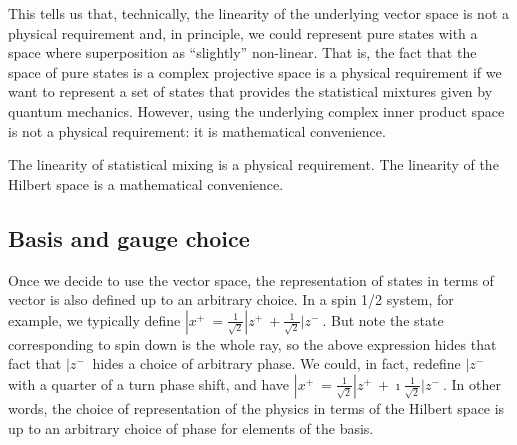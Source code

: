 This tells us that, technically, the linearity of the underlying vector space is not a physical requirement and, in principle, we could represent pure states with a space where superposition as ``slightly'' non-linear. That is, the fact that the space of pure states is a complex projective space is a physical requirement if we want to represent a set of states that provides the statistical mixtures given by quantum mechanics. However, using the underlying complex inner product space is not a physical requirement: it is mathematical convenience.

\begin{insight}
	The linearity of statistical mixing is a physical requirement. The linearity of the Hilbert space is a mathematical convenience.
\end{insight}

\subsection{Basis and gauge choice}

Once we decide to use the vector space, the representation of states in terms of vector is also defined up to an arbitrary choice. In a spin 1/2 system, for example, we typically define $|x^+\> = \frac{1}{\sqrt{2}} | z^+ \> + \frac{1}{\sqrt{2}} | z^- \>$. But note the state corresponding to spin down is the whole ray, so the above expression hides that fact that $|z^-\>$ hides a choice of arbitrary phase. We could, in fact, redefine $|z^-\>$ with a quarter of a turn phase shift, and have $|x^+\> = \frac{1}{\sqrt{2}} | z^+ \> + \imath \frac{1}{\sqrt{2}} | z^- \>$. In other words, the choice of representation of the physics in terms of the Hilbert space is up to an arbitrary choice of phase for elements of the basis.

